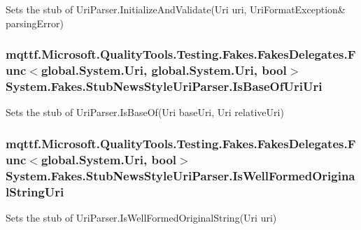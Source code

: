 Sets the stub of Uri\-Parser.\-Initialize\-And\-Validate(Uri uri, Uri\-Format\-Exception\& parsing\-Error)

\hypertarget{class_system_1_1_fakes_1_1_stub_news_style_uri_parser_a75636530ee3af2811fec68c34b3f2292}{
\subsubsection[{Is\-Base\-Of\-Uri\-Uri}]{\setlength{\rightskip}{0pt plus 5cm}mqttf.\-Microsoft.\-Quality\-Tools.\-Testing.\-Fakes.\-Fakes\-Delegates.\-Func$<$global.\-System.\-Uri, global.\-System.\-Uri, bool$>$ System.\-Fakes.\-Stub\-News\-Style\-Uri\-Parser.\-Is\-Base\-Of\-Uri\-Uri}}\label{class_system_1_1_fakes_1_1_stub_news_style_uri_parser_a75636530ee3af2811fec68c34b3f2292}


Sets the stub of Uri\-Parser.\-Is\-Base\-Of(\-Uri base\-Uri, Uri relative\-Uri)

\hypertarget{class_system_1_1_fakes_1_1_stub_news_style_uri_parser_a42d6cb422f44f3080299f15d95319445}{
\subsubsection[{Is\-Well\-Formed\-Original\-String\-Uri}]{\setlength{\rightskip}{0pt plus 5cm}mqttf.\-Microsoft.\-Quality\-Tools.\-Testing.\-Fakes.\-Fakes\-Delegates.\-Func$<$global.\-System.\-Uri, bool$>$ System.\-Fakes.\-Stub\-News\-Style\-Uri\-Parser.\-Is\-Well\-Formed\-Original\-String\-Uri}}\label{class_system_1_1_fakes_1_1_stub_news_style_uri_parser_a42d6cb422f44f3080299f15d95319445}


Sets the stub of Uri\-Parser.\-Is\-Well\-Formed\-Original\-String(\-Uri uri)


